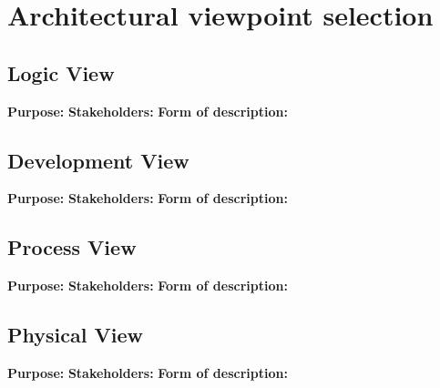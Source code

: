 \section{Architectural viewpoint selection} %


\subsection{Logic View}
{\bf Purpose: }
{\bf Stakeholders: }
{\bf Form of description: }

\subsection{Development View}
{\bf Purpose: }
{\bf Stakeholders: }
{\bf Form of description: }

\subsection{Process View}
{\bf Purpose: }
{\bf Stakeholders: }
{\bf Form of description: }

\subsection{Physical View}
{\bf Purpose: }
{\bf Stakeholders: }
{\bf Form of description: }